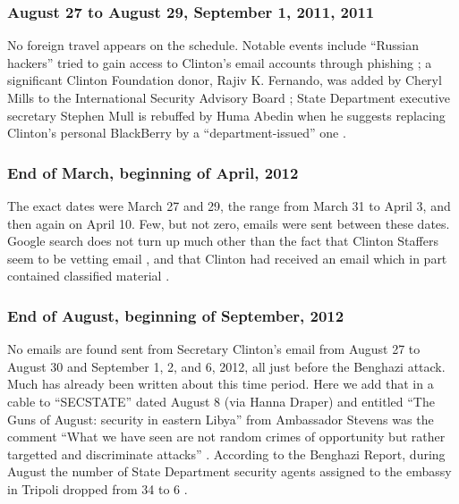 \documentclass[journal]{vgtc}                %
\begin{document}
\subsubsection{August 27 to August 29, September 1, 2011, 2011}
No foreign travel appears on the schedule.  Notable events include ``Russian hackers'' tried to gain access to Clinton's email accounts through phishing \cite{russianHackers2}; a significant Clinton Foundation donor, Rajiv K. Fernando, was added by Cheryl Mills to the International Security Advisory Board  \cite{clintonDonorSecurity}; State Department executive secretary Stephen Mull is rebuffed by Huma Abedin when he suggests replacing Clinton's personal BlackBerry by a ``department-issued'' one \cite{earlyEmails}.

\subsubsection{End of March,  beginning of April, 2012}
The exact dates were March 27 and 29, the range from March 31 to April 3, and then again on April 10.   Few, but not zero, emails were sent between these dates.  Google search does not turn up much other than the fact that Clinton Staffers seem to be vetting email \cite{tightReinRecords, staffVetEmail}, and that Clinton had received an email which in part contained classified material \cite{classifiedInPart}.

\subsubsection{End of August,  beginning of September, 2012}
No emails are found sent from Secretary Clinton's email from August 27 to August 30 and September 1, 2, and 6, 2012, all just before the Benghazi attack.  Much has already been written about this time period.  Here we add that in a cable to ``SECSTATE'' dated August 8 (via Hanna Draper) and entitled ``The Guns of August: security in eastern Libya'' from Ambassador Stevens was the comment ``What we have seen are not random crimes of opportunity but rather targetted and discriminate attacks'' \cite{gunsOfAugust}.  According to the Benghazi Report,  during August the number of State Department security agents assigned to the embassy in Tripoli dropped from 34 to 6 \cite{BenghaziReport}.
\end{document}
